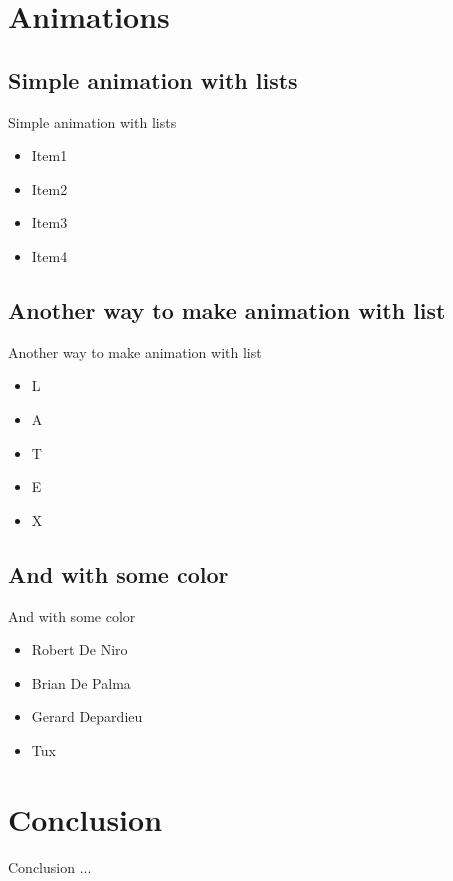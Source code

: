 \documentclass{beamer}
\begin{document}
\section{Animations}
\subsection{Simple animation with lists}
\begin{frame}{Simple animation with lists}
	\begin{itemize}
		\pause \item Item1
		\pause \item Item2
		\pause \item Item3
		\pause \item Item4
	\end{itemize}
\end{frame}

\subsection{Another way to make animation with list}
\begin{frame}{Another way to make animation with list}
	\begin{itemize}[<+->]
		\item L
		\item A
		\item T
		\item E
		\item X
	\end{itemize}
\end{frame}

\subsection{And with some color}
\begin{frame}{And with some color}
	\begin{itemize}
		\item <+-| alert@+> Robert De Niro
		\item <+-| alert@+> Brian De Palma
		\item <+-| alert@+> Gerard Depardieu
		\item <+-| alert@+> Tux
	\end{itemize}
\end{frame}

\section{Conclusion}
\begin{frame}{Conclusion}
	...
\end{frame}
\end{document}
